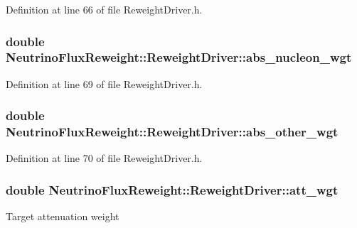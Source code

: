Definition at line 66 of file Reweight\-Driver.\-h.

\hypertarget{class_neutrino_flux_reweight_1_1_reweight_driver_ae110a4925afc9cbbcfa0734248d04747}{
\subsubsection[{abs\-\_\-nucleon\-\_\-wgt}]{\setlength{\rightskip}{0pt plus 5cm}double Neutrino\-Flux\-Reweight\-::\-Reweight\-Driver\-::abs\-\_\-nucleon\-\_\-wgt}}\label{class_neutrino_flux_reweight_1_1_reweight_driver_ae110a4925afc9cbbcfa0734248d04747}


Definition at line 69 of file Reweight\-Driver.\-h.

\hypertarget{class_neutrino_flux_reweight_1_1_reweight_driver_ace1bffcc969ab123df49094a8599cf34}{
\subsubsection[{abs\-\_\-other\-\_\-wgt}]{\setlength{\rightskip}{0pt plus 5cm}double Neutrino\-Flux\-Reweight\-::\-Reweight\-Driver\-::abs\-\_\-other\-\_\-wgt}}\label{class_neutrino_flux_reweight_1_1_reweight_driver_ace1bffcc969ab123df49094a8599cf34}


Definition at line 70 of file Reweight\-Driver.\-h.

\hypertarget{class_neutrino_flux_reweight_1_1_reweight_driver_acf77f623752ed962a5fa5524f3c44653}{
\subsubsection[{att\-\_\-wgt}]{\setlength{\rightskip}{0pt plus 5cm}double Neutrino\-Flux\-Reweight\-::\-Reweight\-Driver\-::att\-\_\-wgt}}\label{class_neutrino_flux_reweight_1_1_reweight_driver_acf77f623752ed962a5fa5524f3c44653}
Target attenuation weight 

